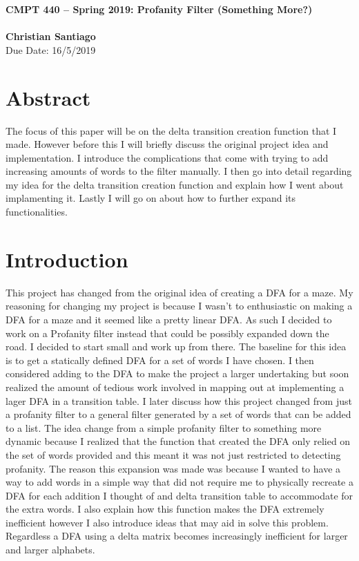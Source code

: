 \documentclass[letter, 12pt]{article}
\begin{document}
\noindent
\large\textbf{CMPT 440 -- Spring 2019: Profanity Filter (Something More?)} \\ \\
\textbf{Christian Santiago} \\
\normalsize   Due Date: 16/5/2019


\section*{Abstract}
The focus of this paper will be on the delta transition creation function that I made. However before this I will briefly discuss the original project idea and implementation. I introduce the complications that come with trying to add increasing amounts of words to the filter manually. I then go into detail regarding my idea for the delta transition creation function and explain how I went about implamenting it. Lastly I will go on about how to further expand its functionalities.

\section*{Introduction}
This project has changed from the original idea of creating a DFA for a maze. My reasoning for changing my project is because I wasn’t to enthusiastic on making a DFA for a maze and it seemed like a pretty linear DFA. As such I decided to work on a Profanity filter instead that could be possibly expanded down the road. I decided to start small and work up from there. The baseline for this idea is to get a statically defined DFA for a set of words I have chosen. I then considered adding to the DFA to make the project a larger undertaking but soon realized the amount of tedious work involved in mapping out at implementing a lager DFA in a transition table. I later discuss how this project changed from just a profanity filter to a general filter generated by a set of words that can be added to a list. The idea change from a simple profanity filter to something more dynamic because I realized that the function that created the DFA only relied on the set of words provided and this meant it was not just restricted to detecting profanity. The reason this expansion was made was because I wanted to have a way to add words in a simple way that did not require me to physically recreate a DFA for each addition I thought of and delta transition table to accommodate for the extra words. I also explain how this function makes the DFA extremely inefficient however I also introduce ideas that may aid in solve this problem. Regardless a DFA using a delta matrix becomes increasingly inefficient for larger and larger alphabets.
\end{document}
